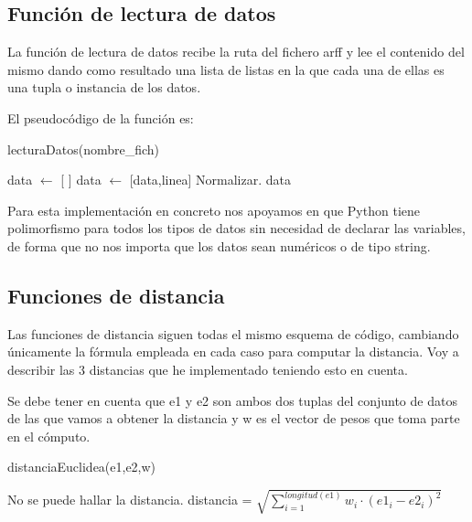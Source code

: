 \documentclass[12pt,a4paper]{article}
\begin{document}
	\subsection{Función de lectura de datos}

	La función de lectura de datos recibe la ruta del fichero arff y lee el contenido del mismo dando como resultado una lista de listas en la que cada una de ellas es una tupla o instancia de los datos.

	El pseudocódigo de la función es:

	\begin{algorithm}
		\caption{lecturaDatos(nombre\_fich)}
		\label{algoritmoLecturaDatos}
		\begin{algorithmic}
			\STATE data $\leftarrow$ [ ]
					\STATE data $\leftarrow$ [data,linea]
				\ENDIF
			\ENDFOR
				\STATE Normalizar.
				\ENDFOR
			\ENDFOR
			\RETURN data
		\end{algorithmic}
	\end{algorithm}

	Para esta implementación en concreto nos apoyamos en que Python tiene polimorfismo para todos los tipos de datos sin necesidad de declarar las variables, de forma que no nos importa que los datos sean numéricos o de tipo string.

	\subsection{Funciones de distancia}

	Las funciones de distancia siguen todas el mismo esquema de código, cambiando únicamente la fórmula empleada en cada caso para computar la distancia. Voy a describir las 3 distancias que he implementado teniendo esto en cuenta.

	Se debe tener en cuenta que e1 y e2 son ambos dos tuplas del conjunto de datos de las que vamos a obtener la distancia y w es el vector de pesos que toma parte en el cómputo.

	\begin{algorithm}
		\caption{distanciaEuclidea(e1,e2,w)}
		\begin{algorithmic}
			\IF{longitud(e1)!=longitud(e2)}
				\STATE No se puede hallar la distancia.
			\ELSE
				\STATE distancia = $\sqrt{\sum_{i=1}^{longitud(e1)}w_i\cdot (e1_i - e2_i)^2}$
			\ENDIF
		\end{algorithmic}
	\end{algorithm}
	
\end{document}
